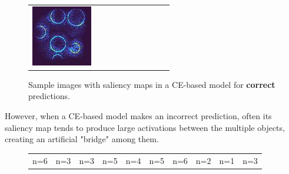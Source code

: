 \documentclass[letterpaper]{article} %
\begin{document}
\begin{figure}[!htbp]
\begin{tabular}{cccccccccc}
\multicolumn{1}{c}{\includegraphics[width=0.07\columnwidth]{figures/appendix/ce/true/92_slc.jpg}} \hspace{-11pt}
\end{tabular}
\caption{Sample images with saliency maps in a CE-based model for \textbf{correct} predictions.}
\label{fig:ce_true}
\end{figure}

However, when a CE-based model makes an incorrect prediction, often its saliency map tends to produce large activations between the multiple objects, creating an artificial "bridge" among them.

\begin{figure}[!htbp]
\centering
\footnotesize
\begin{tabular}{cccccccccc}
\multicolumn{1}{c}{n=6} \hspace{-11pt} &
\multicolumn{1}{c}{n=3} \hspace{-11pt} &
\multicolumn{1}{c}{n=3} \hspace{-11pt} &
\multicolumn{1}{c}{n=5} \hspace{-11pt} &
\multicolumn{1}{c}{n=4} \hspace{-11pt} &
\multicolumn{1}{c}{n=5} \hspace{-11pt} &
\multicolumn{1}{c}{n=6} \hspace{-11pt} &
\multicolumn{1}{c}{n=2} \hspace{-11pt} &
\multicolumn{1}{c}{n=1} \hspace{-11pt} &
\multicolumn{1}{c}{n=3} \\


\end{tabular}
\end{figure}
\end{document}

